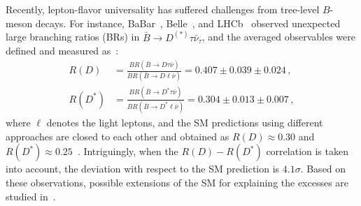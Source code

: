 \documentclass[prd,preprint,superscriptaddress,amsmath,amssymb]{revtex4}
\begin{document}
Recently, lepton-flavor universality has suffered challenges from tree-level $B$-meson decays. For instance, BaBar~\cite{Lees:2012xj,Lees:2013uzd}, Belle~\cite{Huschle:2015rga,Abdesselam:2016cgx,Hirose:2016wfn}, and LHCb~\cite{Aaij:2015yra,Aaij:2017uff} observed unexpected large branching ratios (BRs)  in $\bar B \to D^{(*)} \tau \bar\nu_\tau$, and the averaged observables  were defined and measured as~\cite{Amhis:2016xyh}:
%
\begin{align}
R(D)  & =\frac{BR(\bar B \to D \tau \bar\nu)}{BR(\bar B \to D \ell \bar\nu)} =  0.407 \pm 0.039 \pm 0.024\,,  \nonumber \\
%
 R(D^*)  & = \frac{BR(\bar B \to D^* \tau \bar\nu)}{BR(\bar B \to D^* \ell \bar\nu)}  =  0.304 \pm 0.013 \pm 0.007\,,
\end{align}
 where $\ell$ denotes the light leptons, and  the SM predictions using different approaches are closed to each other and obtained as $R(D) \approx 0.30$ \cite{Lattice:2015rga,Na:2015kha,Bernlochner:2017jka,Jaiswal:2017rve} and $R(D^*) \approx 0.25$~\cite{Fajfer:2012vx,Bigi:2017jbd,Bernlochner:2017jka,Jaiswal:2017rve}.  Intriguingly, when the $R(D)-R(D^*)$ correlation is taken into account, the deviation with respect to the SM prediction is $4.1\sigma$.   Based on these observations, possible extensions of the SM  for explaining the excesses are studied in~\cite{Fajfer:2012jt,Crivellin:2012ye,Datta:2012qk,Bailey:2012jg,Celis:2012dk,Tanaka:2012nw,HernandezSanchez:2012eg,Biancofiore:2013ki,Crivellin:2013wna,Dorsner:2013tla,Dutta:2013qaa,Sakaki:2013bfa,Bhattacharya:2014wla,Alonso:2015sja,Calibbi:2015kma,Freytsis:2015qca,Crivellin:2015hha,Bhattacharya:2015ida,Alonso:2016gym,Das:2016vkr,Li:2016vvp,Boucenna:2016qad,Becirevic:2016yqi,Altmannshofer:2016jzy,Bhattacharya:2016mcc,Bardhan:2016uhr,Dutta:2016eml,Bhattacharya:2016zcw,Alonso:2016oyd,Dutta:2017xmj,Chen:2017hir,Chen:2017eby,Megias:2017ove,Crivellin:2017zlb,Altmannshofer:2017yso,Ciuchini:2017mik,Celis:2017doq,Kamenik:2017tnu,Altmannshofer:2017poe,Alok:2017jaf,Choudhury:2017qyt,Buttazzo:2017ixm,Chen:2017usq,Akeroyd:2017mhr}.
 
\end{document}
